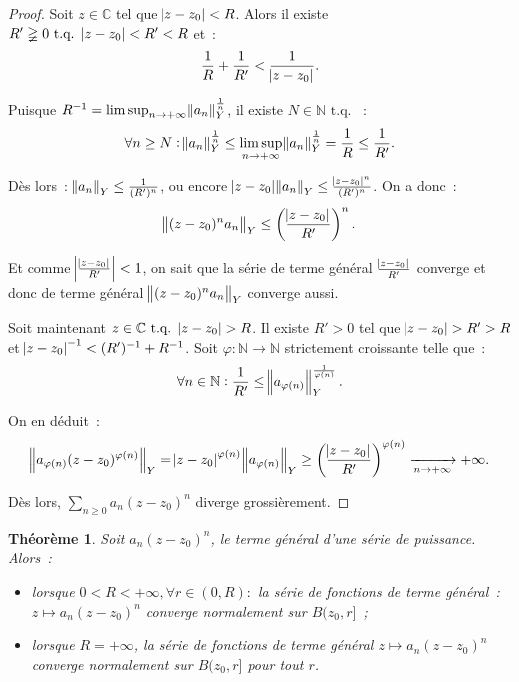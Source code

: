 \documentclass{report}
\newtheorem{thm}{Théorème}[chapter]
\theoremstyle{definition}
\theoremstyle{remark}
\numberwithin{equation}{section}
\newcommand{\C}{\mathbb C}
\newcommand{\N}{\mathbb N}
\newcommand{\tq}{\text{ t.q. }}
\newcommand{\pinfty}{{+\infty}}
\begin{document}
			\begin{proof} Soit $z \in \C$ tel que $\abs {z - z_0} < R$. Alors il existe $R' \gneqq 0 \tq \abs {z - z_0} < R' < R$ et~:
			\begin{equation}
				\frac 1R + \frac 1{R'} < \frac 1{\abs {z - z_0}}.
			\end{equation}

			Puisque $R^{-1} = \limsup_{n \to \pinfty}\norm{a_n}_Y^{\frac 1n}$, il existe $N \in \N \tq$~:
			\begin{equation}
				\forall n \geq N : \norm {a_n}_Y^{\frac 1n} \leq \limsup_{n \to \pinfty} \norm {a_n}_Y^{\frac 1n} = \frac 1R \leq \frac 1{R'}.
			\end{equation}

			Dès lors~: $\norm {a_n}_Y \leq \frac 1{(R')^n}$, ou encore $\abs {z - z_0}\norm {a_n}_Y \leq \frac {\abs {z - z_0}^n}{(R')^n}$. On a donc~:
			\begin{equation}
				\norm {(z-z_0)^na_n}_Y \leq \left(\frac {\abs {z - z_0}}{R'}\right)^n.
			\end{equation}

			Et comme $\abs {\frac {\abs {z - z_0}}{R'}} < 1$, on sait que la série de terme général $\frac {\abs {z - z_0}}{R'}$ converge et donc de terme
			général $\norm {(z - z_0)^na_n}_Y$ converge aussi.

			Soit maintenant $z \in \C \tq \abs {z - z_0} > R$. Il existe $R' > 0$ tel que $\abs {z - z_0} > R' > R$ et $\abs {z - z_0}^{-1} < (R')^{-1} + R^{-1}$.
			Soit $\varphi: \N \to \N$ strictement croissante telle que~:
			\begin{equation}
				\forall n \in \N : \frac 1{R'} \leq \norm {a_{\varphi(n)}}_Y^{\frac 1{\varphi(n)}}.
			\end{equation}

			On en déduit~:
			\begin{equation}
				\norm {a_{\varphi(n)}(z - z_0)^{\varphi(n)}}_Y = \abs {z - z_0}^{\varphi(n)}\norm {a_{\varphi(n)}}_Y
				\geq \left(\frac {\abs {z - z_0}}{R'}\right)^{\varphi(n)} \xrightarrow[n \to \pinfty]{} \pinfty.
			\end{equation}

			Dès lors, $\sum_{n \geq 0}a_n(z - z_0)^n$ diverge grossièrement.
			\end{proof}

			\begin{thm}\label{thm:cvnsurrayondeconvergence} Soit $a_n(z - z_0)^n$, le terme général d'une série de puissance. Alors~:
			\begin{itemize}
				\item lorsque $0 < R < \pinfty, \forall r \in (0, R) :$ la série de fonctions de terme général~: $z \mapsto a_n(z - z_0)^n$ converge normalement
				sur $B(z_0, r]$~;
				\item lorsque $R = \pinfty$, la série de fonctions de terme général $z \mapsto a_n(z - z_0)^n$ converge normalement sur $B(z_0, r]$ pour tout $r$.
			\end{itemize}
			\end{thm}
\end{document}
